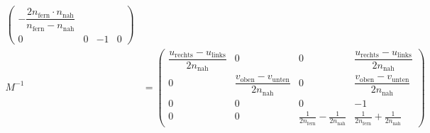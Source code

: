 \begin{itemize}
\begin{align*}
\begin{pmatrix}
	       - \dfrac{2 n_{\mathrm{fern}} \cdot n_{\mathrm{nah}}}{n_{\mathrm{fern}}-n_{\mathrm{nah}}}\\
	       0 & 0 & -1 & 0
	      \end{pmatrix}\\
	M^{-1} &= \begin{pmatrix}
	           \dfrac{u_{\mathrm{rechts}}-u_{\mathrm{links}}}{2n_{\mathrm{nah}}} & 0 & 0 &
	           \dfrac{u_{\mathrm{rechts}}-u_{\mathrm{links}}}{2n_{\mathrm{nah}}}\\
	           0 & \dfrac{v_{\mathrm{oben}}-v_{\mathrm{unten}}}{2n_{\mathrm{nah}}} & 0 & 
	           \dfrac{v_{\mathrm{oben}}-v_{\mathrm{unten}}}{2n_{\mathrm{nah}}}\\
	           0 & 0 & 0 & -1 \\
	           0 & 0 & \frac{1}{2n_{\mathrm{fern}}}-\frac{1}{2n_{\mathrm{nah}}} &
	           \frac{1}{2n_{\mathrm{fern}}}+\frac{1}{2n_{\mathrm{nah}}}
	          \end{pmatrix}
	\end{align*}
\end{itemize}